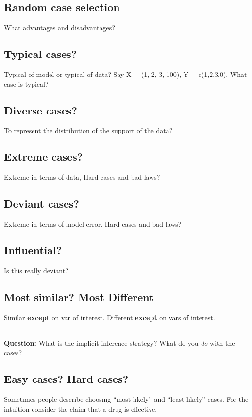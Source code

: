 \documentclass[11pt]{article}
\begin{document}
\subsection{Random case selection}
What advantages and disadvantages?

\subsection{Typical cases?}
Typical of model or typical of data? Say X = (1, 2, 3, 100), Y = c(1,2,3,0). What case is typical?

\subsection{Diverse cases?}
To represent the  distribution of the support of the data?

\subsection{Extreme cases?}
Extreme in terms of data, Hard cases and bad laws?

\subsection{Deviant cases?}
Extreme in terms of model error. Hard cases and bad laws?

\subsection{Influential?}
Is this really deviant?

\subsection{Most similar? Most Different}
Similar \textbf{except} on var of interest. 
Different \textbf{except} on vars of interest. 


\bigskip \\

\noindent \textbf{Question:} What is the implicit inference strategy? What do you \textit{do} with the cases?

\subsection{Easy cases? Hard cases?}
Sometimes people describe choosing ``most likely'' and ``least likely'' cases. For the intuition consider the claim that a drug is effective. 
\end{document}
